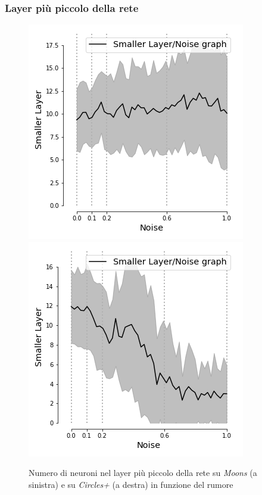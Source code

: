 \documentclass{beamer}
\begin{document}
\begin{frame}
 \frametitle{Layer più piccolo della rete }
    \begin{figure}
    \includegraphics[scale = 0.42]{images/small_noise_moons.png}
    \includegraphics[scale = 0.42]{images/small_noise_circles+.png}
    \caption{\large Numero di neuroni nel layer più piccolo della rete su \textit{Moons} (a sinistra) e su \textit{Circles+} (a destra) in funzione del rumore}
 \end{figure}
\end{frame}
\end{document}
